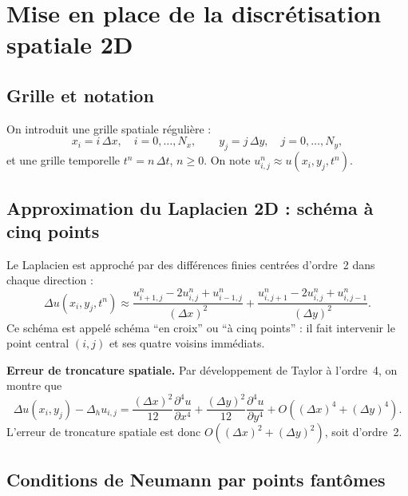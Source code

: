 \documentclass[11pt,a4paper]{report}
\begin{document}
\section{Mise en place de la discr\'etisation spatiale 2D}

\subsection*{Grille et notation}

On introduit une grille spatiale r\'eguli\`ere :
\begin{equation}
  x_i = i\,\Delta x,\quad i=0,\ldots,N_x,\qquad
  y_j = j\,\Delta y,\quad j=0,\ldots,N_y,
\end{equation}
et une grille temporelle $t^n = n\,\Delta t$, $n\ge 0$.
On note $u_{i,j}^n \approx u(x_i,y_j,t^n)$.

\subsection*{Approximation du Laplacien 2D : sch\'ema \`a cinq points}

Le Laplacien est approch\'e par des diff\'erences finies centr\'ees d'ordre~2 dans
chaque direction :
\begin{equation}\label{eq:laplacien2d}
  \Delta u(x_i,y_j,t^n) \approx
  \frac{u_{i+1,j}^n-2u_{i,j}^n+u_{i-1,j}^n}{(\Delta x)^2}
  +\frac{u_{i,j+1}^n-2u_{i,j}^n+u_{i,j-1}^n}{(\Delta y)^2}.
\end{equation}
Ce sch\'ema est appel\'e sch\'ema ``en croix'' ou ``\`a cinq points'' : il fait intervenir
le point central $(i,j)$ et ses quatre voisins imm\'ediats.

\textbf{Erreur de troncature spatiale.}
Par d\'eveloppement de Taylor \`a l'ordre~4, on montre que
\begin{equation}
  \Delta u(x_i,y_j) - \Delta_h u_{i,j}
  = \frac{(\Delta x)^2}{12}\frac{\partial^4 u}{\partial x^4}
  + \frac{(\Delta y)^2}{12}\frac{\partial^4 u}{\partial y^4}
  + O\!\left((\Delta x)^4+(\Delta y)^4\right).
\end{equation}
L'erreur de troncature spatiale est donc $O((\Delta x)^2+(\Delta y)^2)$, soit d'ordre~2.

\subsection*{Conditions de Neumann par points fant\^omes}
\end{document}
